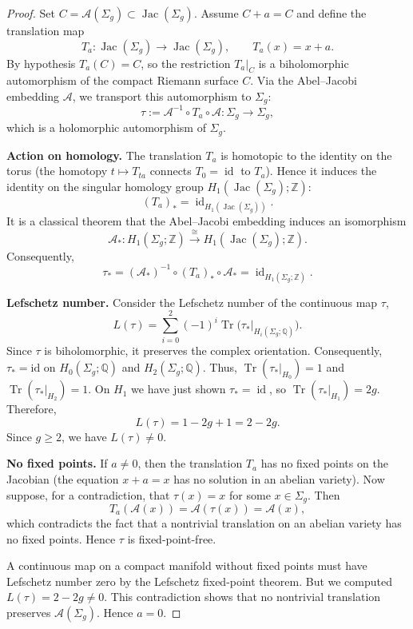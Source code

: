 \documentclass[11pt]{article}
\theoremstyle{definition}
\begin{document}
	\begin{proof}
		Set $C = \mathcal A(\Sigma_g)\subset \operatorname{Jac}(\Sigma_g)$.
		Assume $C + a = C$ and define the translation map
		\[
		T_a : \operatorname{Jac}(\Sigma_g)\longrightarrow \operatorname{Jac}(\Sigma_g),
		\qquad T_a(x)=x+a.
		\]
		By hypothesis $T_a(C)=C$, so the restriction $T_a|_C$ is a biholomorphic
		automorphism of the compact Riemann surface $C$. Via the Abel--Jacobi embedding
		$\mathcal A$, we transport this automorphism to $\Sigma_g$:
		\[
		\tau := \mathcal A^{-1} \circ T_a \circ \mathcal A : \Sigma_g \longrightarrow
		\Sigma_g,
		\]
		which is a holomorphic automorphism of $\Sigma_g$.
		
		\medskip\noindent
		\textbf{Action on homology.}
		The translation $T_a$ is homotopic to the identity on the torus (the homotopy
		$t\mapsto T_{ta}$ connects $T_0=\operatorname{id}$ to $T_a$). Hence it induces
		the identity on the singular homology group $H_1(\operatorname{Jac}(\Sigma_g);\mathbb{Z})$:
		\[
		(T_a)_* = \operatorname{id}_{H_1(\operatorname{Jac}(\Sigma_g))}.
		\]
		It is a classical theorem that the Abel--Jacobi embedding induces an isomorphism
		\[
		\mathcal A_*: H_1(\Sigma_g;\mathbb Z) \stackrel{\cong}{\longrightarrow}
		H_1(\operatorname{Jac}(\Sigma_g);\mathbb Z).
		\]
		Consequently,
		\[
		\tau_* = (\mathcal A_*)^{-1} \circ (T_a)_* \circ \mathcal A_* =
		\operatorname{id}_{H_1(\Sigma_g;\mathbb{Z})}.
		\]
		
		\medskip\noindent
		\textbf{Lefschetz number.}
		Consider the Lefschetz number of the continuous map $\tau$,
		\[
		L(\tau) = \sum_{i=0}^{2} (-1)^i \operatorname{Tr}\bigl(\tau_*|_{H_i(\Sigma_g;\mathbb{Q})}\bigr).
		\]
		Since $\tau$ is biholomorphic, it preserves the complex orientation.
		Consequently, $\tau_*=\mathrm{id}$ on $H_0(\Sigma_g;\mathbb Q)$ and
		$H_2(\Sigma_g;\mathbb Q).$ Thus, $\operatorname{Tr}(\tau_*|_{H_0}) = 1$ and
		$\operatorname{Tr}(\tau_*|_{H_2}) = 1$. On $H_1$ we have just shown $\tau_* =
		\operatorname{id}$, so $\operatorname{Tr}(\tau_*|_{H_1}) = 2g$. Therefore,
		\[
		L(\tau) = 1 - 2g + 1 = 2 - 2g.
		\]
		Since $g \ge 2$, we have $L(\tau) \neq 0$.
		
		\medskip\noindent
		\textbf{No fixed points.}
		If $a \neq 0$, then the translation $T_a$ has no fixed points on the Jacobian
		(the equation $x+a=x$ has no solution in an abelian variety). Now suppose, for a
		contradiction, that $\tau(x) = x$ for some $x\in\Sigma_g$. Then
		\[
		T_a(\mathcal A(x)) = \mathcal A(\tau(x)) = \mathcal A(x),
		\]
		which contradicts the fact that a nontrivial translation on an abelian variety
		has no fixed points. Hence $\tau$ is fixed-point-free.
		
		A continuous map on a compact manifold without fixed points must have Lefschetz
		number zero by the Lefschetz fixed-point theorem. But we computed $L(\tau) =
		2-2g \neq 0$. This contradiction shows that no nontrivial translation preserves
		$\mathcal A(\Sigma_g)$. Hence $a=0$.
	\end{proof}
	
\end{document}
